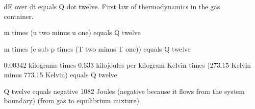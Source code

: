 dE over dt equals Q dot twelve. First law of thermodynamics in the gas container.

m times (u two minus u one) equals Q twelve

m times (c sub p times (T two minus T one)) equals Q twelve

0.00342 kilograms times 0.633 kilojoules per kilogram Kelvin times (273.15 Kelvin minus 773.15 Kelvin) equals Q twelve

Q twelve equals negative 1082 Joules (negative because it flows from the system boundary) (from gas to equilibrium mixture)